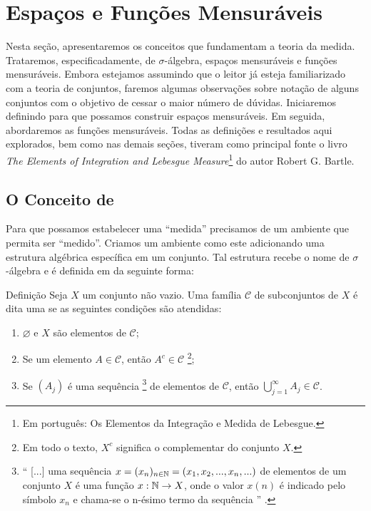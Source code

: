 \chapter{Espaços e Funções Mensuráveis}

Nesta seção, apresentaremos os conceitos que fundamentam a teoria da medida. Trataremos, especificadamente, de $\sigma$-álgebra, espaços mensuráveis e funções mensuráveis. 
Embora estejamos assumindo que o leitor já esteja familiarizado com a teoria de conjuntos, faremos algumas observações sobre notação de alguns conjuntos com o objetivo de cessar o maior número de dúvidas.
Iniciaremos definindo \sigal para que possamos construir espaços mensuráveis.
Em seguida, abordaremos as funções mensuráveis.
Todas as definições e resultados aqui explorados, bem como nas demais seções,  tiveram como principal fonte o livro \textit{The Elements of Integration and Lebesgue Measure}\footnote{Em português: Os Elementos da Integração e Medida de Lebesgue.} do autor Robert G. Bartle.

\section{O Conceito de \sigal}
Para que possamos estabelecer uma \enquote{medida} precisamos de um ambiente que permita ser \enquote{medido}. 
Criamos um ambiente como este adicionando uma estrutura algébrica específica em um conjunto.
Tal estrutura recebe o nome de $\sigma$-álgebra e é definida em \cite{bartle} da seguinte forma:

\begin{env}{Definição}
\label{def:sigma-algebra}
    Seja $X$ um conjunto não vazio. Uma família $\mathcal{C}$ de subconjuntos de $X$ é dita uma \sigal se as seguintes condições são atendidas:
    \begin{enumerate}[label*= (\roman*)]
        \item $\varnothing$ e $X$ são elementos de $\mathcal{C}$;     
        \item Se um elemento $A \in \mathcal{C}$, então $A^c \in \mathcal{C}$
        \footnote{Em todo o texto, $X^c$ significa o complementar do conjunto $X$.};
        \item Se $(A_j)$ é uma sequência
        \footnote{
        	\enquote{%
        	[...] uma sequência 
        	$x = (x_n)_{n \in \operatorname{\mathbb{N}}} = (x_1, x_2,..., x_n,...)$ de elementos de um conjunto
        	$X$ é uma função $x: \operatorname{\mathbb{N}} \to X$, onde o valor $x(n)$ é indicado pelo símbolo $x_n$ e chama-se o n-ésimo termo da sequência%
        	} \cite[p.25]{elon}.
    	} de elementos de $\mathcal{C}$, 
        então $\displaystyle \bigcup_{j = 1}^\infty A_j \in \mathcal{C}$.
        \vspace{-0.2cm}
    \end{enumerate}
\end{env}

